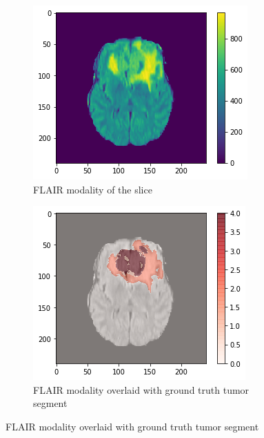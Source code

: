 \begin{figure}[H]
    \centering
    \begin{subfigure}{.33\textwidth}
        \centering
        \includegraphics[width=\linewidth]{chapters/07_brats3d/images/04_flair.png}
        \caption{FLAIR modality of the slice}
    \end{subfigure}%
    \begin{subfigure}{.33\textwidth}
        \centering
        \includegraphics[width=\linewidth]{chapters/07_brats3d/images/08_flair_segment.png}
        \caption{FLAIR modality overlaid with ground truth tumor segment}

\end{subfigure}
\end{figure}
